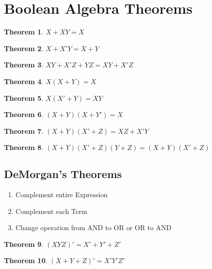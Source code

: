 \documentclass[12pt]{article}
\newtheorem{theorem}{Theorem}
\begin{document}
\section*{Boolean Algebra Theorems}

\begin{theorem}
    $X + XY = X$
\end{theorem}

\begin{theorem}
    $X + X'Y = X + Y$
\end{theorem}

\begin{theorem}
    $XY + X'Z + YZ = XY + X'Z$
\end{theorem}

\begin{theorem}
    $X (X + Y) = X$
\end{theorem}

\begin{theorem}
    $X (X' + Y) = XY$
\end{theorem}

\begin{theorem}
    $(X + Y)(X + Y') = X$
\end{theorem}

\begin{theorem}
    $(X + Y)(X' + Z) = XZ + X'Y$
\end{theorem}

\begin{theorem}
    $(X + Y)(X' + Z)(Y + Z) = (X + Y)(X' + Z)$
\end{theorem}

\subsection*{DeMorgan's Theorems}

\begin{enumerate}
    \item Complement entire Expression
    \item Complement each Term
    \item Change operation from AND to OR or OR to AND
\end{enumerate}

\begin{theorem}
    $(XYZ)' = X' + Y' + Z'$ 
\end{theorem}

\begin{theorem}
    $(X + Y + Z)' = X'Y'Z'$
\end{theorem}
\end{document}
